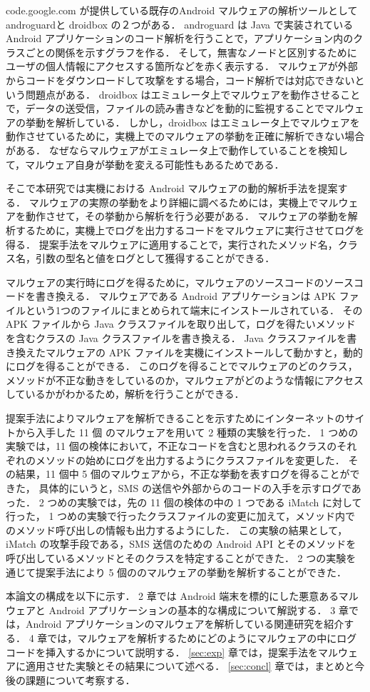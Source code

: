 code.google.com が提供している既存のAndroid マルウェアの解析ツールとして androguard\cite{aguard}と droidbox\cite{dbox} の２つがある．
androguard は Java で実装されている Android アプリケーションのコード解析を行うことで，アプリケーション内のクラスごとの関係を示すグラフを作る．
そして，無害なノードと区別するためにユーザの個人情報にアクセスする箇所などを赤く表示する．
マルウェアが外部からコードをダウンロードして攻撃をする場合，コード解析では対応できないという問題点がある．
droidbox はエミュレータ上でマルウェアを動作させることで，データの送受信，ファイルの読み書きなどを動的に監視することでマルウェアの挙動を解析している．
しかし，droidbox はエミュレータ上でマルウェアを動作させているために，実機上でのマルウェアの挙動を正確に解析できない場合がある．
なぜならマルウェアがエミュレータ上で動作していることを検知して，マルウェア自身が挙動を変える可能性もあるためである．

そこで本研究では実機における Android マルウェアの動的解析手法を提案する．
マルウェアの実際の挙動をより詳細に調べるためには，実機上でマルウェアを動作させて，その挙動から解析を行う必要がある．
マルウェアの挙動を解析するために，実機上でログを出力するコードをマルウェアに実行させてログを得る．
提案手法をマルウェアに適用することで，実行されたメソッド名，クラス名，引数の型名と値をログとして獲得することができる．

マルウェアの実行時にログを得るために，マルウェアのソースコードのソースコードを書き換える．
マルウェアである Android アプリケーションは APK ファイルという1つのファイルにまとめられて端末にインストールされている．
その APK ファイルから Java クラスファイルを取り出して，ログを得たいメソッドを含むクラスの Java クラスファイルを書き換える．
Java クラスファイルを書き換えたマルウェアの APK ファイルを実機にインストールして動かすと，動的にログを得ることができる．
このログを得ることでマルウェアのどのクラス，メソッドが不正な動きをしているのか，マルウェアがどのような情報にアクセスしているかがわかるため，解析を行うことができる．

提案手法によりマルウェアを解析できることを示すためにインターネットのサイト\cite{malwaresite}から入手した 11 個 のマルウェアを用いて 2 種類の実験を行った．
1 つめの実験では，11 個の検体において，不正なコードを含むと思われるクラスのそれぞれのメソッドの始めにログを出力するようにクラスファイルを変更した．
その結果，11 個中 5 個のマルウェアから，不正な挙動を表すログを得ることができた，
具体的にいうと，SMS の送信や外部からのコードの入手を示すログであった．
2 つめの実験では，先の 11 個の検体の中の 1 つである iMatch に対して行った，
1 つめの実験で行ったクラスファイルの変更に加えて，メソッド内でのメソッド呼び出しの情報も出力するようにした．
この実験の結果として，iMatch の攻撃手段である，SMS 送信のための Android API とそのメソッドを呼び出しているメソッドとそのクラスを特定することができた．
2 つの実験を通じて提案手法により 5 個ののマルウェアの挙動を解析することができた．

本論文の構成を以下に示す．
2 章では Android 端末を標的にした悪意あるマルウェアと Android アプリケーションの基本的な構成について解説する．
3 章では，Android アプリケーションのマルウェアを解析している関連研究を紹介する．
4 章では，マルウェアを解析するためにどのようにマルウェアの中にログコードを挿入するかについて説明する．
\ref{sec:exp} 章では，提案手法をマルウェアに適用させた実験とその結果について述べる．
\ref{sec:concl} 章では，まとめと今後の課題について考察する．
